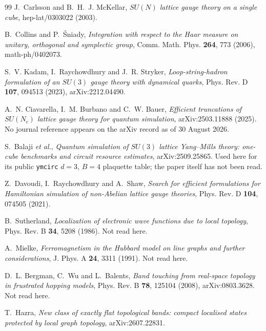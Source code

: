 \documentclass[10pt,twocolumn]{article}
\theoremstyle{plain}
\theoremstyle{definition}
\theoremstyle{remark}
\begin{document}
\begin{thebibliography}{99}
 J.~Carlsson and B.~H.~J. McKellar,
  \emph{$SU(N)$ lattice gauge theory on a single cube}, hep-lat/0303022 (2003).

 B.~Collins and P.~\'Sniady,
  \emph{Integration with respect to the Haar measure on unitary, orthogonal and
  symplectic group}, Comm. Math. Phys. \textbf{264}, 773 (2006),
  math-ph/0402073.

 S.~V. Kadam, I.~Raychowdhury and J.~R. Stryker,
  \emph{Loop-string-hadron formulation of an $SU(3)$ gauge theory with dynamical
  quarks}, Phys. Rev. D \textbf{107}, 094513 (2023), arXiv:2212.04490.

 A.~N. Ciavarella, I.~M. Burbano and C.~W. Bauer,
  \emph{Efficient truncations of $SU(N_c)$ lattice gauge theory for quantum
  simulation}, arXiv:2503.11888 (2025). No journal reference appears on the
  arXiv record as of 30 August 2026.

 S.~Balaji \emph{et al.},
  \emph{Quantum simulation of $SU(3)$ lattice Yang--Mills theory: one-cube
  benchmarks and circuit resource estimates}, arXiv:2509.25865. Used here for
  its public \texttt{ymcirc} $d=3$, $B=4$ plaquette table; the paper itself has
  not been read.

 Z.~Davoudi, I.~Raychowdhury and A.~Shaw,
  \emph{Search for efficient formulations for Hamiltonian simulation of
  non-Abelian lattice gauge theories}, Phys. Rev. D \textbf{104}, 074505
  (2021).

 B.~Sutherland,
  \emph{Localization of electronic wave functions due to local topology},
  Phys. Rev. B \textbf{34}, 5208 (1986). Not read here.

 A.~Mielke,
  \emph{Ferromagnetism in the Hubbard model on line graphs and further
  considerations}, J. Phys. A \textbf{24}, 3311 (1991). Not read here.

 D.~L. Bergman, C.~Wu and L.~Balents,
  \emph{Band touching from real-space topology in frustrated hopping models},
  Phys. Rev. B \textbf{78}, 125104 (2008), arXiv:0803.3628. Not read here.

 T.~Hazra,
  \emph{New class of exactly flat topological bands: compact localised states
  protected by local graph topology}, arXiv:2607.22831.

\end{thebibliography}
\end{document}
